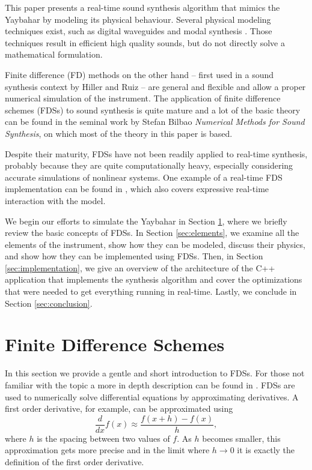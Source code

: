 \documentclass{article}
\begin{document}
This paper presents a real-time sound synthesis algorithm that mimics the Yaybahar by modeling its physical behaviour.
Several physical modeling techniques exist, such as digital waveguides \cite{smith1992physical} and modal synthesis \cite{morrison1993mosaic}. Those techniques result in efficient high quality sounds, but do not directly solve a mathematical formulation.

Finite difference (FD) methods on the other hand -- first used in a sound synthesis context by Hiller and Ruiz \cite{Hiller1971} -- are general and flexible and allow a proper numerical simulation of the instrument.
The application of finite difference schemes (FDSs) to sound synthesis is quite mature and a lot of the basic theory can be found in the seminal work by Stefan Bilbao \textit{Numerical Methods for Sound Synthesis}\cite{bilbao_numerical_2009}, on which most of the theory in this paper is based.

Despite their maturity, FDSs have not been readily applied to real-time synthesis, probably because they are quite computationally heavy, especially considering accurate simulations of nonlinear systems.
One example of a real-time FDS implementation can be found in \cite{willemsen_real-time_2019}, which also covers expressive real-time interaction with the model.

We begin our efforts to simulate the Yaybahar in Section \ref{sec:finiteDifferenceSchemes}, where we briefly review the basic concepts of FDSs.
In Section \ref{sec:elements}, we examine all the elements of the instrument, show how they can be modeled, discuss their physics, and show how they can be implemented using FDSs.
Then, in Section \ref{sec:implementation}, we give an overview of the architecture of the C++ application that implements the synthesis algorithm and cover the optimizations that were needed to get everything running in real-time.
Lastly, we conclude in Section \ref{sec:conclusion}.

\section{Finite Difference Schemes}
\label{sec:finiteDifferenceSchemes}

In this section we provide a gentle and short introduction to FDSs. For those not familiar with the topic a more in depth description can be found in \cite{bilbao_numerical_2009}.
FDSs are used to numerically solve differential equations by approximating derivatives. A first order derivative, for example, can be approximated using
\begin{equation}
  \frac{d}{dx} f(x) \approx \frac{f(x + h) - f(x)}{h},
\end{equation}
where $h$ is the spacing between two values of $f$. As $h$ becomes smaller, this approximation gets more precise and in the limit where $h\rightarrow 0$ it is exactly the definition of the first order derivative.
\end{document}
